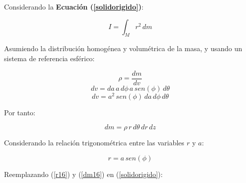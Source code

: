 \documentclass[letter,oneside,11pt]{article}
\begin{document}
Considerando la \textbf{Ecuación (\ref{solidorigido})}:

\begin{equation*}
    I = \int_{M} r^2\, dm
\tag{4}
\end{equation*}

Asumiendo la distribución homogénea y volumétrica de la masa, y usando un
sistema de referencia esférico:

\begin{equation*}
    \rho = \frac{dm}{dv}
\end{equation*}
\begin{equation*}
    dv = da\, a\, d\phi\, a\, sen (\phi)\, d\theta
\end{equation*}
\begin{equation*}
    dv = a^2\, sen (\phi)\, da\, d\phi\, d\theta
\end{equation*}

Por tanto:

\begin{equation}
    dm = \rho\, r\, d\theta\, dr\, dz
\label{dm16}
\end{equation}

Considerando la relación trigonométrica entre las variables $r$ y $a$:

\begin{equation}
    r = a\, sen (\phi)
\label{r16}
\end{equation}

Reemplazando (\ref{r16}) y (\ref{dm16}) en (\ref{solidorigido}): 
\end{document}
